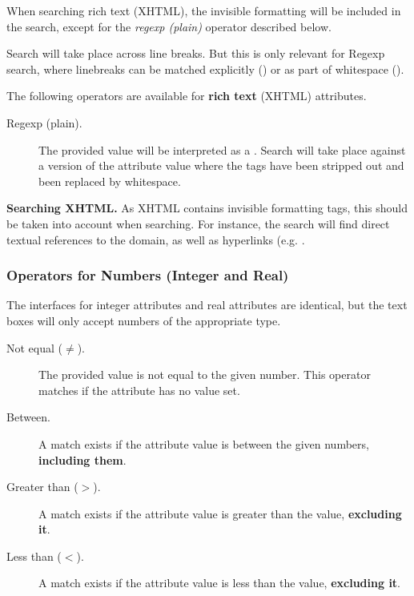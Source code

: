 {{{\begin{info}
When searching rich text (XHTML), the invisible formatting will be included in the search, except for the \textit{regexp (plain)} operator described below.

Search will take place across line breaks.  But this is only relevant for Regexp search, where linebreaks can be matched explicitly () or as part of whitespace ().
\end{info}

The following operators are available for \textbf{rich text} (XHTML) attributes.

\begin{description}
\item[Regexp (plain).] The provided value will be interpreted as a .  Search will take place against a version of the attribute value where the tags have been stripped out and been replaced by whitespace.
\end{description}

\begin{example}
\textbf{Searching XHTML.}  As XHTML contains invisible formatting tags, this should be taken into account when searching.  For instance, the search   will find direct textual references to the domain, as well as hyperlinks (e.g. .
\end{example}

\subsubsection{Operators for Numbers (Integer and Real)}

The interfaces for integer attributes and real attributes are identical, but the text boxes will only accept numbers of the appropriate type.

\begin{description}
\item[Not equal ($\neq$).] The provided value is not equal to the given number. This operator matches if the attribute has no value set.
\item[Between.] A match exists if the attribute value is between the given numbers, \textbf{including them}.
\item[Greater than ($>$).] A match exists if the attribute value is greater than the value, \textbf{excluding it}.
\item[Less than ($<$).] A match exists if the attribute value is less than the value, \textbf{excluding it}.
\end{description}

}}}
